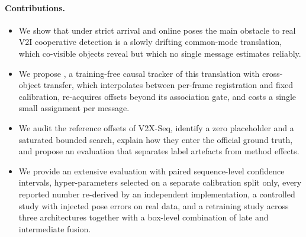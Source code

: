 \paragraph{Contributions.}
\begin{itemize}
  \item We show that under strict arrival and online poses the main obstacle to real V2I cooperative detection is a slowly drifting common-mode translation, which co-visible objects reveal but which no single message estimates reliably.
  \item We propose \method, a training-free causal tracker of this translation with cross-object transfer, which interpolates between per-frame registration and fixed calibration, re-acquires offsets beyond its association gate, and costs a single small assignment per message.
  \item We audit the reference offsets of V2X-Seq, identify a zero placeholder and a saturated bounded search, explain how they enter the official ground truth, and propose an evaluation that separates label artefacts from method effects.
  \item We provide an extensive evaluation with paired sequence-level confidence intervals, hyper-parameters selected on a separate calibration split only, every reported number re-derived by an independent implementation, a controlled study with injected pose errors on real data, and a retraining study across three architectures together with a box-level combination of late and intermediate fusion.
\end{itemize}


